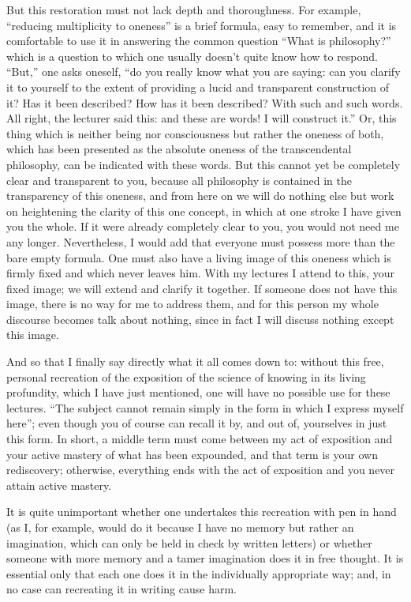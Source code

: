 But this restoration must not lack depth and thoroughness.
For example, “reducing multiplicity to oneness” is
a brief formula, easy to remember, and it is comfortable to use it
in answering the common question “What is philosophy?”
which is a question to which one usually doesn't quite know how to respond.
“But,” one asks oneself, “do you really know what you are saying:
can you clarify it to yourself to the extent of
providing a lucid and transparent construction of it?
Has it been described? How has it been described?
With such and such words. All right, the lecturer said this:
and these are words! I will construct it.”
Or, this thing which is neither being nor consciousness but rather
the oneness of both, which has been presented as
the absolute oneness of the transcendental philosophy,
can be indicated with these words.
But this cannot yet be completely clear and transparent to you,
because all philosophy is contained in the transparency of this oneness,
and from here on we will do nothing else but work on
heightening the clarity of this one concept,
in which at one stroke I have given you the whole.
If it were already completely clear to you,
you would not need me any longer.
Nevertheless, I would add that everyone must possess
more than the bare empty formula.
One must also have a living image of this oneness
which is firmly fixed and which never leaves him.
With my lectures I attend to this, your fixed image;
we will extend and clarify it together.
If someone does not have this image,
there is no way for me to address them, and
for this person my whole discourse becomes talk about nothing,
since in fact I will discuss nothing except this image.

And so that I finally say directly what it all comes down to:
without this free, personal recreation of the exposition of
the science of knowing in its living profundity,
which I have just mentioned,
one will have no possible use for these lectures.
“The subject cannot remain simply in the form
in which I express myself here”;
even though you of course can recall it by, and out of,
yourselves in just this form.
In short, a middle term must come between my act of exposition
and your active mastery of what has been expounded,
and that term is your own rediscovery;
otherwise, everything ends with the act of exposition and
you never attain active mastery.

It is quite unimportant whether one undertakes
this recreation with pen in hand
(as I, for example, would do it because I have no memory
but rather an imagination,
which can only be held in check by written letters)
or whether someone with more memory and a tamer imagination
does it in free thought.
It is essential only that each one does it
in the individually appropriate way;
and, in no case can recreating it in writing cause harm.


